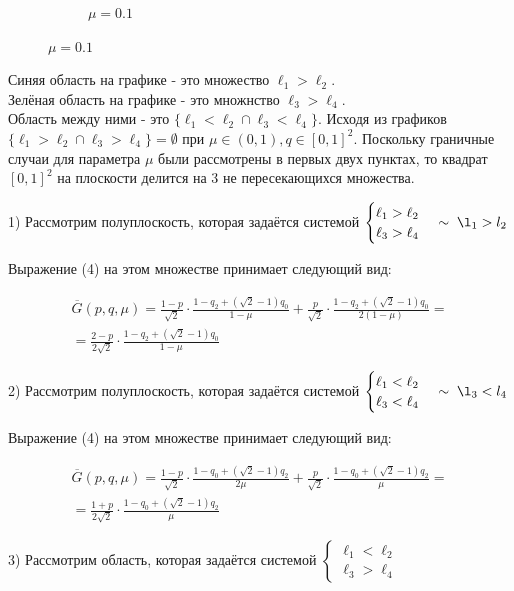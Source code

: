 \begin{flushleft}
\begin{figure}[h]
\begin{subfigure}[b]{0.22 \textwidth}
         	\caption{$\mu=0.1$}
         	\label{fig:five over x}
     	\end{subfigure}
	\end{figure}
	
	Синяя область на графике - это множество $\ell_1 > \ell_2$.\\
	Зелёная область на графике - это множнство $\ell_3 > \ell_4$.\\
	Область между ними - это $\{\ell_1<\ell_2 \cap \ell_3 < \ell_4\}$.
	Исходя из графиков $\{\ell_1>\ell_2 \cap \ell_3 > \ell_4\} = \emptyset$ 
	при $\mu \in (0, 1), q \in [0, 1]^2$.
	Поскольку граничные случаи для параметра $\mu$ были рассмотрены в первых
	двух пунктах, то квадрат $[0,1]^2$ на плоскости делится на 3 не 
	пересекающихся множества.

	1) Рассмотрим полуплоскость, которая задаётся системой
	$\begin{cases}
			\ell_1 > \ell_2 \\
			\ell_3 > \ell_4
	\end{cases} \sim \; \l_1 > l_2$
	
	Выражение (4) на этом множестве принимает следующий вид:
	
	\begin{gather*}
		\overline G(p,q,\mu)=
		\frac{1-p}{\sqrt{2}} \cdot \frac{1-q_2+(\sqrt{2}-1)q_0}{1-\mu} + 
		\frac{p}{\sqrt{2}} \cdot \frac{1-q_2+(\sqrt{2}-1)q_0}{2(1-\mu)} = \\
		=\frac{2-p}{2\sqrt{2}}\cdot\frac{1-q_2+(\sqrt{2}-1)q_0}{1-\mu}		
	\end{gather*}
	
	2) Рассмотрим полуплоскость, которая задаётся системой
	$\begin{cases}
			\ell_1 < \ell_2 \\
			\ell_3 < \ell_4
	\end{cases} \sim \; \l_3 < l_4$
	
	Выражение (4) на этом множестве принимает следующий вид:
	
	\begin{gather*}
		\overline G(p,q,\mu)=
		\frac{1-p}{\sqrt{2}} \cdot \frac{1-q_0+(\sqrt{2}-1)q_2}{2\mu} + 
		\frac{p}{\sqrt{2}} \cdot \frac{1-q_0+(\sqrt{2}-1)q_2}{\mu} = \\
		=\frac{1+p}{2\sqrt{2}}\cdot\frac{1-q_0+(\sqrt{2}-1)q_2}{\mu}		
	\end{gather*}
	
	3) Рассмотрим область, которая задаётся системой
	$\begin{cases}
			\ell_1 < \ell_2 \\
			\ell_3 > \ell_4
	\end{cases}$


\end{flushleft}
